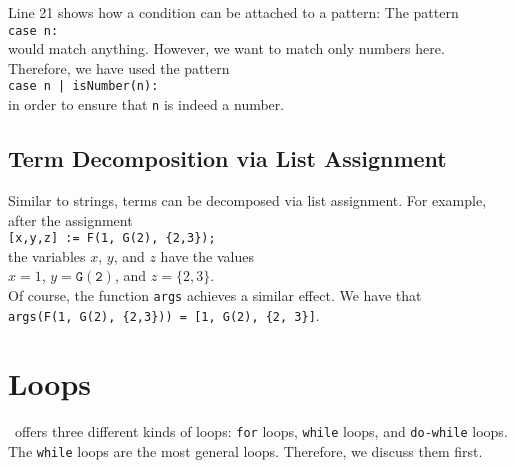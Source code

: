 Line 21 shows how a condition can be attached to a pattern:  The pattern 
\\[0.2cm]
\hspace*{1.3cm}
\texttt{case n:}
\\[0.2cm]
would match anything.  However, we want to match only numbers here.  Therefore, we have used
the pattern
\\[0.2cm]
\hspace*{1.3cm}
\texttt{case n | isNumber(n):}
\\[0.2cm]
in order to ensure that \texttt{n} is indeed a number.

\subsection{Term Decomposition via List Assignment}
Similar to strings, terms can be decomposed via list assignment.  For example, after the assignment
\\[0.2cm]
\hspace*{1.3cm}
\texttt{[x,y,z] := F(1, G(2), \{2,3\});}
\\[0.2cm]
the variables $x$, $y$, and $z$ have the values
\\[0.2cm]
\hspace*{1.3cm}
$x = 1$, \quad $y = \mathtt{G(2)}$, \quad and \quad $z = \{2,3\}$.
\\[0.2cm]
Of course, the function \texttt{args} achieves a similar effect.  We have that
\\[0.2cm]
\hspace*{1.3cm}
\texttt{args(F(1, G(2), \{2,3\})) = [1, G(2), \{2, 3\}]}.

\section{Loops}
\setlx\ offers three different kinds of loops: \texttt{for} loops, \texttt{while} loops, and
\texttt{do-while} loops.  The \texttt{while} loops are the most general loops.  Therefore, we discuss them first.  

